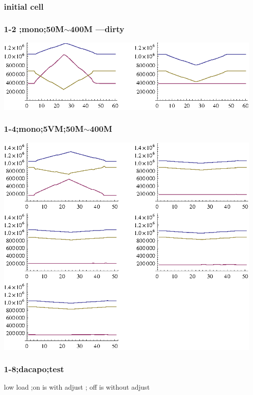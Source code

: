 \documentclass{article}
\begin{document}
\subsubsection*{initial cell}

\subsubsection*{1-2 ;mono;50M$\sim $400M ---dirty}

\includegraphics{workload_gr1.eps}

\subsubsection*{1-4;mono;5VM;50M$\sim $400M}

\includegraphics{workload_gr2.eps}

\subsubsection*{1-8;dacapo;test}

low load ;on is with adjust ; off is without adjust
\end{document}
